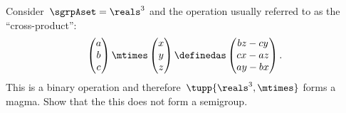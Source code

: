 \begin{exercise}
    \label{ex:cross_prod}
    Consider~$\sgrpAset=\reals^3$ and the operation usually referred to as the ``cross-product'':
    \begin{equation*}
        \begin{pmatrix}
            a\\ b\\ c
        \end{pmatrix}\mtimes \begin{pmatrix}
                                 x\\ y \\ z
        \end{pmatrix}\definedas
        \begin{pmatrix}
            bz-cy \\
            cx-az \\
            ay-bx
        \end{pmatrix}.
    \end{equation*}
    This is a binary operation and therefore~$\tupp{\reals^3,\mtimes}$ forms a magma.
    Show that the this does not form a semigroup.
\end{exercise}
%
